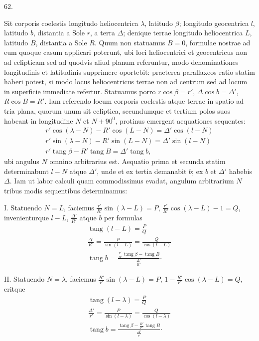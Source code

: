 \par{}\medskip
\hypertarget{native-081-article062}{}
\begin{center}62.\end{center}
Sit corporis coelestis longitudo heliocentrica $\lambda$, latitudo $\beta$; longitudo geocentrica $l$, latitudo $b$, distantia a Sole $r$, a terra $\Delta$; denique terrae longitudo heliocentrica $L$, latitudo $B$, distantia a Sole $R$. Quum non statuamus $B=0$, formulae nostrae ad eum quoque casum applicari poterunt, ubi loci heliocentrici et geocentricus non ad eclipticam sed ad quodvis aliud planum referuntur, modo denominationes longitudinis et latitudinis supprimere oportebit: praeterea parallaxeos ratio statim haberi potest, si modo locus heliocentricus terrae non ad centrum sed ad locum in superficie immediate refertur. Statuamus porro $r\cos\beta=r'$, $\Delta\cos b=\Delta'$, $R\cos B=R'$. Iam referendo locum corporis coelestis atque terrae in spatio ad tria plana, quorum unum sit ecliptica, secundumque et tertium polos suos habeant in longitudine $N$ et $N+90^0$, protinus emergent aequationes sequentes:
\[
\begin{gathered}
r'\cos(\lambda-N)-R'\cos(L-N)=\Delta'\cos(l-N)\\
r'\sin(\lambda-N)-R'\sin(L-N)=\Delta'\sin(l-N)\\
r'\operatorname{tang}\beta-R'\operatorname{tang}B=\Delta'\operatorname{tang}b,
\end{gathered}
\]
ubi angulus $N$ omnino arbitrarius est. Aequatio prima et secunda statim determinabunt $l-N$ atque $\Delta'$, unde et ex tertia demanabit $b$; ex $b$ et $\Delta'$ habebis $\Delta$. Iam ut labor calculi quam commodissimus evadat, angulum arbitrarium $N$ tribus modis sequentibus determinamus:

I. Statuendo $N=L$, faciemus $\frac{r'}{R'}\sin(\lambda-L)=P$, $\frac{r'}{R'}\cos(\lambda-L)-1=Q$, invenienturque $l-L$, $\frac{\Delta'}{R'}$ atque $b$ per formulas
\[
\begin{gathered}
\operatorname{tang}(l-L)=\frac{P}{Q}\\[.5em]
\frac{\Delta'}{R'}=\frac{P}{\sin(l-L)}=\frac{Q}{\cos(l-L)}\\[.5em]
\operatorname{tang}b=\frac{\frac{r'}{R'}\operatorname{tang}\beta-\operatorname{tang}B}{\frac{\Delta'}{R'}}\mathord{\cdot}
\end{gathered}
\]

II. Statuendo $N=\lambda$, faciemus $\frac{R'}{r'}\sin(\lambda-L)=P$, $1-\frac{R'}{r'}\cos(\lambda-L)=Q$, eritque
\[
\begin{gathered}
\operatorname{tang}(l-\lambda)=\frac{P}{Q}\\[.5em]
\frac{\Delta'}{r'}=\frac{P}{\sin(l-\lambda)}=\frac{Q}{\cos(l-\lambda)}\\[.5em]
\operatorname{tang}b=\frac{\operatorname{tang}\beta-\frac{R'}{r'}\operatorname{tang}B}{\frac{\Delta'}{r'}}\mathord{\cdot}
\end{gathered}
\]


